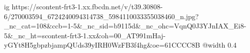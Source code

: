  
 
 
 
 

\ifcmt
  ig https://scontent-frt3-1.xx.fbcdn.net/v/t39.30808-6/270003594_6724240094314738_5984110033355038460_n.jpg?_nc_cat=108&ccb=1-5&_nc_sid=b9115d&_nc_ohc=VqnQ0J3YJnIAX_Ei8-5&_nc_ht=scontent-frt3-1.xx&oh=00_AT991mHaj-yGYt8H5gbpzbjampQUds39yIRH0WzFB3f4hg&oe=61CCCC8B
  @width 0.4
\fi
